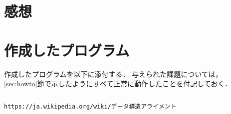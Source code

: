 \documentclass[a4j,11pt]{jarticle}
\begin{document}
\section{感想}



\section{作成したプログラム}\label{sec:sourcecode}

作成したプログラムを以下に添付する．
与えられた課題については，\ref{sec:howto}節で示したようにすべて正常に動作したことを付記しておく．

%
%
{\fontsize{10pt}{11pt} \selectfont
\begin{verbatim}
\end{verbatim}
}

  \verb|https://ja.wikipedia.org/wiki/データ構造アライメント|
\end{document}
